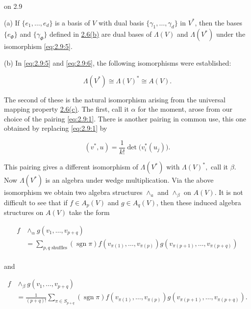 \begin{remarks}{on 2.9}\label{thm:2.10}

(a) If $\{e_1, \ldots, e_d\}$ is a basis of $V$ with dual basis $\{\gamma_1, \ldots, \gamma_d\}$ in $V^*$, then the bases $\{e_\Phi\}$ and $\{\gamma_\Phi\}$ defined in \hyperref[thm:2.6]{2.6(b)} are dual bases of $\Lambda(V)$ and $\Lambda(V^*)$ under the isomorphism \eqref{eq:2.9:5}.

(b) In \eqref{eq:2.9:5} and \eqref{eq:2.9:6}, the following isomorphisms were established:

\[
\Lambda(V^{*})\cong\Lambda(V)^{*}\cong A(V).
\]

The second of these is the natural isomorphism arising from the universal mapping property \hyperref[thm:2.6]{2.6(c)}. The first, call it $\alpha$ for the moment, arose from our choice of the pairing \eqref{eq:2.9:1}. There is another pairing in common use, this one obtained by replacing \eqref{eq:2.9:1} by

\begin{equation}
\tag{1}\label{eq:2.10:1}
(v^{*},u)=\frac{1}{k!}\det\bigl(v_{i}^{*}(u_{j})\bigr).
\end{equation}

This pairing gives a different isomorphism of $\Lambda(V^*)$ with $\Lambda(V)^*,$ call it $\beta$. Now $\Lambda(V^*)$ is an algebra under wedge multiplication. Via the above isomorphism we obtain two algebra structures $\wedge_a$ and $\wedge_\beta$ on $A(V)$. It is not difficult to see that if $f\in A_p(V)$ and $g\in A_q(V)$, then these induced algebra structures on $A(V)$ take the form

\begin{equation}
\tag{2}\label{eq:2.10:2}
\begin{aligned}{f}&{{}\wedge_{\alpha}g(v_{1},\ldots,v_{p+q})}\\ {}&{{}=\sum_{p,q\text{ shuffles}}(\operatorname{sgn}\pi)f(v_{\pi(1)},\ldots,v_{\pi(p)})g(v_{\pi(p+1)},\ldots,v_{\pi(p+q)})}\\ \end{aligned}
\end{equation}

and


\begin{equation}
\tag{3}\label{eq:2.10:3}
\begin{aligned}{f}&{{}\wedge_{\beta}g(v_{1},\ldots,v_{p+q})}\\ {}&{{}=\frac{1}{(p+q)!}\sum_{\pi\in S_{p+q}}(\operatorname{sgn}\pi)f(v_{\pi(1)},\ldots,v_{\pi(p)})g(v_{\pi(p+1)},\ldots,v_{\pi(p+q)}).}\\ \end{aligned}
\end{equation}


\end{remarks}

